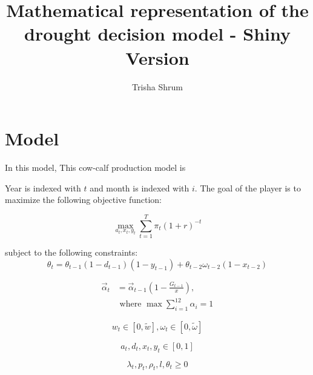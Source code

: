 \documentclass[11pt]{article}
\title{Mathematical representation of the drought decision model - Shiny Version}
\author{Trisha Shrum}
\begin{document}
\maketitle

\section{Model}
In this model, This cow-calf production model is 



Year is indexed with $t$ and month is indexed with $i$. The goal of the player is to maximize the following objective function:

\begin{equation}
\max_{a_t, x_t, y_t} \sum_{t=1}^T \pi_t(1+r)^{-t}
\end{equation}

subject to the following constraints:
\begin{equation}
\theta_t = \theta_{t-1} (1- d_{t-1}) (1 - y_{t-1}) + \theta_{t-2} \omega_{t-2} (1 - x_{t-2})
\end{equation} 

\begin{align}
\vec{\alpha}_t &= \vec{\alpha}_{t-1} \left(1 - \frac{G_{t-1}}{x}\right), \\
&\text{ where } \max \sum_{i=1}^{12} \alpha_{i}  = 1 
\end{align}


\begin{equation}
w_t \in [0,\tilde{w}],  \omega_t \in [0,\tilde{\omega}]
\end{equation}

\begin{equation}
a_t, d_t, x_t, y_t \in [0,1]
\end{equation}

\begin{equation}
\lambda_t, p_t, \rho_t, l, \theta_t \ge 0 
\end{equation}
\end{document}
